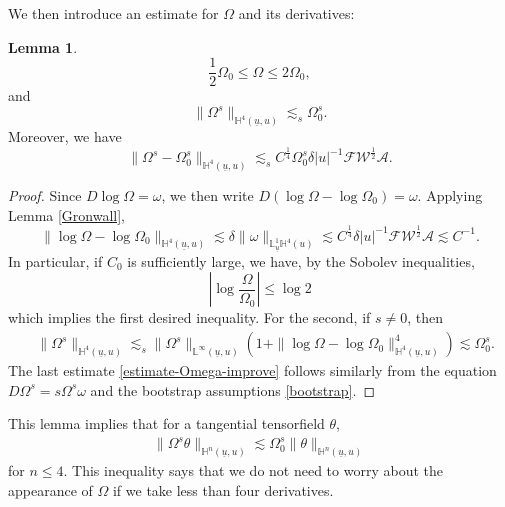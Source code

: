 \documentclass[11pt,reqno]{amsart}
\theoremstyle{definition}
\newtheorem{lemma}{Lemma}[section]
\numberwithin{equation}{section}
\renewcommand{\L}{\mathbb{L}}
\renewcommand{\H}{\mathbb{H}}
\def\ub{\underline{u}}
\begin{document}
We then introduce an estimate for $\Omega$ and its derivatives:

\begin{lemma}
\begin{equation}\label{estimate-Omega}
\frac{1}{2}\Omega_0\leq\Omega\leq2\Omega_0,
\end{equation}
and
\begin{equation*}
\|\Omega^s\|_{\H^4(\ub,u)}\lesssim_s \Omega_0^s.
\end{equation*}
Moreover, we have
\begin{equation}\label{estimate-Omega-improve}
\|\Omega^s-\Omega_0^s\|_{\H^4(\ub,u)}\lesssim_s C^{\frac{1}{4}}\Omega_0^s\delta|u|^{-1}\mathscr{F}\mathscr{W}^{\frac{1}{2}}\mathcal{A}.
\end{equation}
\end{lemma}

\begin{proof}
Since $D\log{\Omega}=\omega$, we then write $D(\log\Omega-\log\Omega_0)=\omega$. Applying Lemma \ref{Gronwall}, 
\begin{equation*}
\|\log{\Omega}-\log{\Omega_0}\|_{\H^4(\ub,u)}\lesssim\delta\|\omega\|_{\L_{\ub}^1\H^4(u)}
\lesssim C^{\frac{1}{4}} \delta|u|^{-1}\mathscr{F}\mathscr{W}^{\frac{1}{2}}\mathcal{A}\lesssim C^{-1}.
\end{equation*}
In particular, if $C_0$ is sufficiently large, we have, by the Sobolev inequalities,
\begin{equation*}
\left|\log\frac{\Omega}{\Omega_0}\right|\le\log 2
\end{equation*}
which implies the first desired inequality. For the second, if $s\ne0$, then
\begin{align*}
&\|\Omega^s\|_{\H^4(\ub,u)}
\lesssim_s\|\Omega^s\|_{\L^{\infty}(\ub,u)}(1+\|\log{\Omega}-\log\Omega_0\|_{\H^4(\ub,u)}^4)\lesssim \Omega_0^s.
\end{align*}
The last estimate \eqref{estimate-Omega-improve} follows similarly from the equation $D\Omega^s=s\Omega^{s}\omega$ and the bootstrap assumptions \eqref{bootstrap}.
\end{proof}
This lemma implies that for a tangential tensorfield $\theta$, 
\begin{align}\label{estimate-Omegaequ}
\|\Omega^s\theta\|_{\H^n(\ub,u)}\lesssim \Omega_0^s\|\theta\|_{\H^n(\ub,u)}
\end{align}
for $n\le 4$. This inequality says that we do not need to worry about the appearance of $\Omega$ if we take less than four derivatives.
\end{document}
